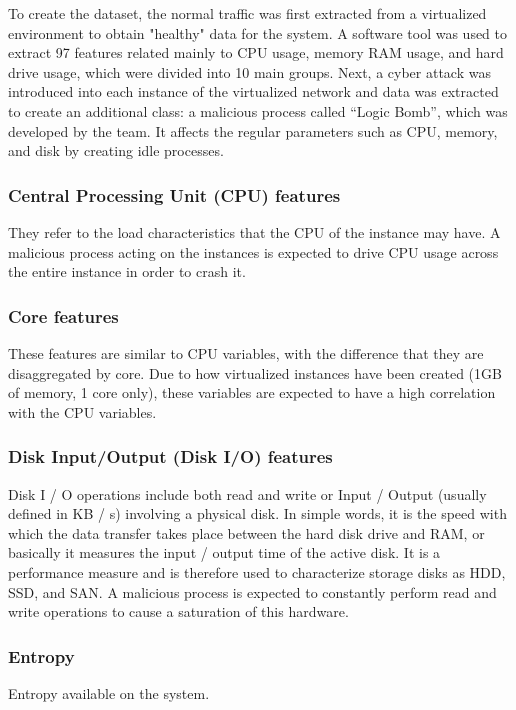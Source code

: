 \documentclass{iosart2c}
\begin{document}
To create the dataset, the normal traffic was first extracted from a virtualized environment to obtain "healthy" data for the system. A software tool was used to extract 97 features related mainly to CPU usage, memory RAM usage, and hard drive usage, which were divided into 10 main groups. Next, a cyber attack was introduced into each instance of the virtualized network and data was extracted to create an additional class: a malicious process called  ``Logic Bomb'', which was developed by the team. It affects the regular parameters such as CPU, memory, and disk by creating idle processes.

\subsubsection{Central Processing Unit (CPU) features}
They refer to the load characteristics that the CPU of the instance may have. A malicious process acting on the instances is expected to drive CPU usage across the entire instance in order to crash it.\\


\subsubsection{Core features}
These features are similar to CPU variables, with the difference that they are disaggregated by core. Due to how virtualized instances have been created (1GB of memory, 1 core only), these variables are expected to have a high correlation with the CPU variables.


\subsubsection{Disk Input/Output (Disk I/O) features}
Disk I / O operations include both read and write or Input / Output (usually defined in KB / s) involving a physical disk. In simple words, it is the speed with which the data transfer takes place between the hard disk drive and RAM, or basically it measures the input / output time of the active disk. It is a performance measure and is therefore used to characterize storage disks as HDD, SSD, and SAN. A malicious process is expected to constantly perform read and write operations to cause a saturation of this hardware. \\

\subsubsection{Entropy}
Entropy available on the system.
\end{document}
